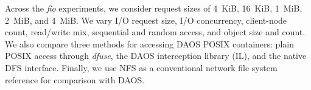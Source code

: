 Across the \textit{fio} experiments, we consider request sizes of 4~KiB, 16~KiB, 1~MiB, 2~MiB, and 4~MiB. We vary I/O request size, I/O concurrency, client-node count, read/write mix, sequential and random access, and object size and count. We also compare three methods for accessing DAOS POSIX containers: plain POSIX access through \textit{dfuse}, the DAOS interception library (IL), and the native DFS interface. Finally, we use NFS as a conventional network file system reference for comparison with DAOS.

